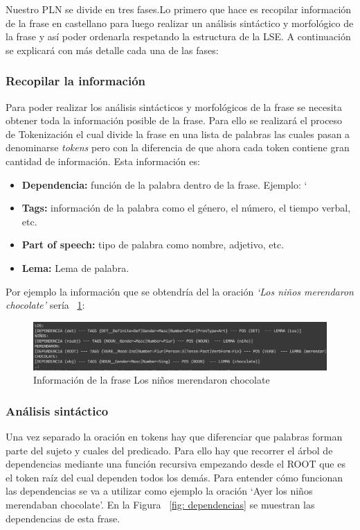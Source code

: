 Nuestro PLN se divide en tres fases.Lo primero que hace es recopilar información de la frase en castellano para luego realizar un análisis sintáctico y morfológico de la frase y así poder ordenarla respetando la estructura de la LSE. A continuación se explicará con más detalle cada una de las fases:

\subsubsection{Recopilar la  información} 
Para poder realizar los análisis sintácticos y morfológicos de la frase se necesita obtener toda la información posible de la frase. Para ello se realizará el proceso de Tokenización el cual divide la frase en una lista de palabras las cuales pasan a denominarse \textit{tokens} pero con la diferencia de que ahora cada token contiene gran cantidad de información. Esta información es:


\begin{itemize}
	
	\item \textbf{Dependencia:} función de la palabra dentro de la frase. Ejemplo: `
	\item \textbf{Tags:} información de la palabra como el género, el número, el tiempo verbal, etc.
	\item \textbf{Part of speech:} tipo de palabra como nombre, adjetivo, etc.
	\item \textbf{Lema:} Lema de palabra.	
	
\end{itemize}


Por ejemplo la información que se obtendría del la oración \textit{`Los niños merendaron chocolate'} sería ~\ref {fig: tokenInformacion}:
\begin{figure}[h]
	\centering
	\includegraphics[width=1 \textwidth]{Imagenes/Fuentes/PNL/InfoPLN.png}
	\caption{ Información de la frase Los niños merendaron chocolate}
	\label {fig: tokenInformacion}
\end{figure}



\subsubsection{Análisis sintáctico} 
Una vez separado la oración en tokens hay que diferenciar que palabras forman parte del sujeto y cuales del predicado. Para ello hay que recorrer el árbol de dependencias mediante una función recursiva empezando desde el ROOT que es el token raíz del cual dependen todos los demás. Para entender cómo funcionan las dependencias se va a utilizar como ejemplo la oración `Ayer los niños merendaban chocolate'. En la Figura ~\ref {fig: dependencias} se muestran las dependencias de esta frase.

